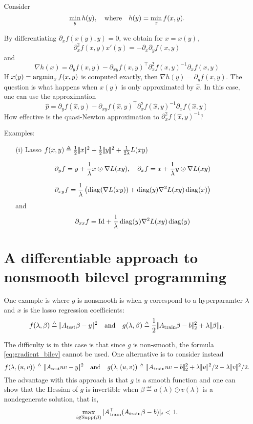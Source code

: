 \documentclass{article}
\begin{document}
Consider
$$
\min_y h(y), \quad \text{where} \quad h(y) =  \min_x  f(x,y).
$$




By differentiating $\partial_x f(x(y),y) = 0$, we obtain  for $x = x(y)$, $$
\partial_x^2 f(x,y) x'(y)  =-\partial_x \partial_y f(x,y)
$$
and$$
\nabla h(x)  =   \partial_y f(x,y) - \partial_{xy} f(x,y)^\top \partial_x^2 f(x,y) ^{-1}  \partial_x f(x,y) 
$$
If $x(y) = \operatorname{argmin}_x f(x,y)$ is computed exactly, then $\nabla h(y) = \partial_y f(x,y)$. The question is what happens when $x(y)$ is only approximated by $\hat x$.  In this case, one can use the approximation
$$
\hat p = \partial_y f(\hat x,y) - \partial_{xy} f(\hat x,y)^\top \partial_x^2 f(\hat x,y) ^{-1}  \partial_x f(\hat x,y) 
$$
How effective is the quasi-Newton approximation to $\partial_x^2 f(\hat x,y) ^{-1} $?


Examples:
\begin{itemize}
\item[(i)]  Lasso $ f(x,y)\triangleq \frac{1}{2} |\!| x |\!|^2 + \frac12 |\!| y |\!|^2  + \frac{1}{2\lambda} L(xy)
$

\begin{align*}
\partial_y f= y +\frac{1}{\lambda} x\odot \nabla L(xy),\quad\partial_x f= x +\frac{1}{\lambda} y\odot \nabla L(xy)
\end{align*}

$$
\partial_{xy} f = \frac{1}{\lambda}\left(  \operatorname{diag}(\nabla L(xy)) + \operatorname{diag}(y) \nabla^2 L(xy) \operatorname{diag}(x)  \right)
$$
and
$$
\partial_{xx} f = \mathrm{Id} + \frac{1}{\lambda} \operatorname{diag}(y) \nabla^2 L(xy) \operatorname{diag}(y)
$$

\end{itemize}


\section{A differentiable approach to nonsmooth bilevel programming}


One example is where $g$ is nonsmooth is when $y$ correspond to a hyperparamter $\lambda$ and $x$ is the lasso regression coefficients:  $$
f(\lambda,\beta)\triangleq |\!| A_{\text{test}}\beta - y |\!|^2\quad \text{and} \quad g(\lambda,\beta) \triangleq \frac12 |\!| A_{\text{train}}\beta - b |\!|_2^2 +\lambda |\!| \beta |\!|_1.
$$

The difficulty is in this case is that since $g$ is non-smooth, the formula \eqref{eq:gradient_bilev} cannot be used. One alternative is to consider instead
$$
f(\lambda,(u,v))\eqdef \norm{A_{\text{test}} uv - y}^2\qandq g(\lambda,(u,v)) \eqdef  \norm{A_{\text{train}}uv - b}_2^2 +\lambda \norm{u}^2/2+\lambda\norm{v}^2/2.
$$
The advantage with this approach is that $g$ is a smooth function and one can show that the Hessian of $g$ is invertible when $\beta\eqdef u(\lambda)\odot v(\lambda)$ is a nondegenerate solution, that is,
$$
\max_{i\not\in\operatorname{Supp}(\beta)} |  A_{\text{train}}^\top(A_{\text{train}}\beta - b) |_i <1.
$$
\end{document}
